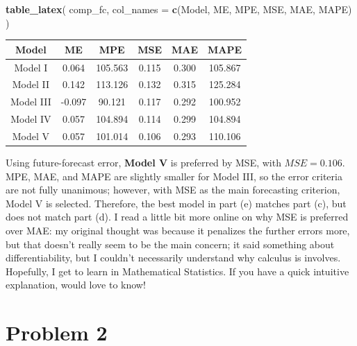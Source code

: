 \documentclass[
  10pt,
]{extarticle}
\newenvironment{Shaded}{\begin{snugshade}}{\end{snugshade}}
\newcommand{\AttributeTok}[1]{\textcolor[rgb]{0.13,0.29,0.53}{#1}}
\newcommand{\FunctionTok}[1]{\textcolor[rgb]{0.13,0.29,0.53}{\textbf{#1}}}
\newcommand{\NormalTok}[1]{#1}
\newcommand{\StringTok}[1]{\textcolor[rgb]{0.31,0.60,0.02}{#1}}
\begin{document}
\begin{Shaded}
\begin{Highlighting}[]
\FunctionTok{table\_latex}\NormalTok{(}
\NormalTok{  comp\_fc,}
  \AttributeTok{col\_names =} \FunctionTok{c}\NormalTok{(}\StringTok{\textquotesingle{}Model\textquotesingle{}}\NormalTok{, }\StringTok{\textquotesingle{}ME\textquotesingle{}}\NormalTok{, }\StringTok{\textquotesingle{}MPE\textquotesingle{}}\NormalTok{, }\StringTok{\textquotesingle{}MSE\textquotesingle{}}\NormalTok{, }\StringTok{\textquotesingle{}MAE\textquotesingle{}}\NormalTok{, }\StringTok{\textquotesingle{}MAPE\textquotesingle{}}\NormalTok{)}
\NormalTok{)}
\end{Highlighting}
\end{Shaded}

\begin{table}[H]
\centering
\begin{tabular}{cccccc}
\toprule
Model & ME & MPE & MSE & MAE & MAPE\\
\midrule
Model I & 0.064 & 105.563 & 0.115 & 0.300 & 105.867\\
Model II & 0.142 & 113.126 & 0.132 & 0.315 & 125.284\\
Model III & -0.097 & 90.121 & 0.117 & 0.292 & 100.952\\
Model IV & 0.057 & 104.894 & 0.114 & 0.299 & 104.894\\
Model V & 0.057 & 101.014 & 0.106 & 0.293 & 110.106\\
\bottomrule
\end{tabular}
\end{table}

Using future-forecast error, \textbf{Model V} is preferred by MSE, with \(MSE = 0.106\). MPE, MAE, and MAPE are slightly smaller for Model III, so the error criteria are not fully unanimous; however, with MSE as the main forecasting criterion, Model V is selected. Therefore, the best model in part (e) matches part (c), but does not match part (d). I read a little bit more online on why MSE is preferred over MAE: my original thought was because it penalizes the further errors more, but that doesn't really seem to be the main concern; it said something about differentiability, but I couldn't necessarily understand why calculus is involves. Hopefully, I get to learn in Mathematical Statistics. If you have a quick intuitive explanation, would love to know!

\newpage

\section{Problem 2}\label{problem-2}
\end{document}
